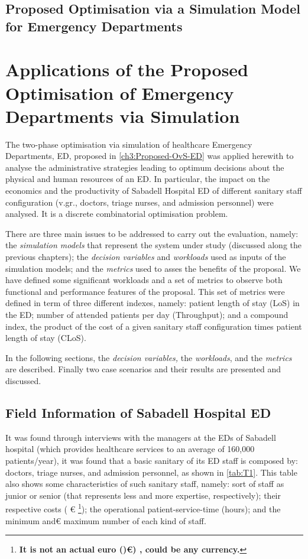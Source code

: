 \documentclass[11pt]{article} %
\begin{document}
\subsection{Proposed Optimisation via a Simulation Model for Emergency Departments}
\label{ssec:two-phase}

\section{Applications of the Proposed Optimisation of Emergency Departments via Simulation}
\label{sec:app}

The two-phase optimisation via simulation of healthcare Emergency
Departments, ED, proposed in \ref{ch3:Proposed-OvS-ED} was applied
herewith to analyse the administrative strategies leading to optimum
decisions about the physical and human resources of an ED. In particular,
the impact on the economics and the productivity of Sabadell Hospital
ED of different sanitary staff configuration (v.gr., doctors, triage
nurses, and admission personnel) were analysed. It is a discrete combinatorial optimisation problem.

There are three main issues to be addressed to carry out the evaluation,
namely: the \textit{simulation models} that represent the system under
study (discussed along the previous chapters); the \textit{decision
variables} and\textit{ workloads} used as inputs of the simulation
models; and the \textit{metrics} used to asses the benefits of the
proposal. We have defined some significant workloads and a set of
metrics to observe both functional and performance features of the
proposal. This set of metrics were defined in term of three different
indexes, namely: patient length of stay (LoS) in the ED; number of
attended patients per day (Throughput); and a compound index, the
product of the cost of a given sanitary staff configuration times
patient length of stay (CLoS).

In the following sections, the \textit{decision variables, }the\textit{
workloads}, and the \textit{metrics} are described. Finally two case
scenarios and their results are presented and discussed. 

\subsection{Field Information of Sabadell Hospital ED}
\label{ssec:sabadell}

It was found through interviews with the managers at the EDs of Sabadell
hospital (which provides healthcare services to an average of 160,000
patients/year), it was found that a basic sanitary of its ED staff
is composed by: doctors, triage nurses, and admission
personnel, as shown in \ref{tab:T1}. This
table also shows some characteristics of such sanitary staff, namely:
sort of staff as junior or senior (that represents less and more expertise,
respectively); their respective costs ( \euro \textbf{}%
\footnote{\textbf{It is not an actual euro ()\euro) , could be any currency.\label{fn:euro}}%
}); the operational patient-service-time (hours); and the minimum and\euro
maximum number of each kind of staff. 
\end{document}
